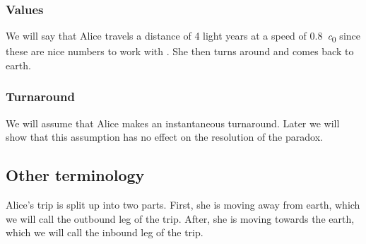 			\subsubsection{Values}
				We will say that Alice travels a distance of 4 light years at a speed of \SI{0.8}{\clight} since these are nice numbers to work with \autocite[\pno~35]{kogut2012introduction}.
				She then turns around and comes back to earth.
			\subsubsection{Turnaround}
				We will assume that Alice makes an instantaneous turnaround.
				Later we will show that this assumption has no effect on the resolution of the paradox.
		\subsection{Other terminology}
			Alice's trip is split up into two parts.
			First, she is moving away from earth, which we will call the outbound leg of the trip.
			After, she is moving towards the earth, which we will call the inbound leg of the trip.
